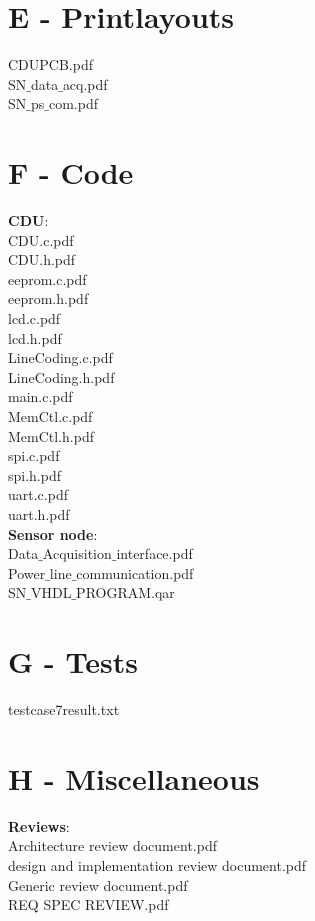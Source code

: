 \section{E - Printlayouts}
CDUPCB.pdf\\
SN$\_$data$\_$acq.pdf\\
SN$\_$ps$\_$com.pdf
\section{F - Code}
\textbf{CDU}:\\
CDU.c.pdf\\
CDU.h.pdf\\
eeprom.c.pdf\\
eeprom.h.pdf\\
lcd.c.pdf\\
lcd.h.pdf\\
LineCoding.c.pdf\\
LineCoding.h.pdf\\
main.c.pdf\\
MemCtl.c.pdf\\
MemCtl.h.pdf\\
spi.c.pdf\\
spi.h.pdf\\
uart.c.pdf\\
uart.h.pdf\\
\textbf{Sensor node}:\\
Data$\_$Acquisition$\_$interface.pdf\\
Power$\_$line$\_$communication.pdf\\
SN$\_$VHDL$\_$PROGRAM.qar\\
\section{G - Tests}
testcase7result.txt\\
\section{H - Miscellaneous}
\textbf{Reviews}:\\
Architecture review document.pdf\\
design and implementation review document.pdf\\
Generic review document.pdf\\
REQ SPEC REVIEW.pdf\\
